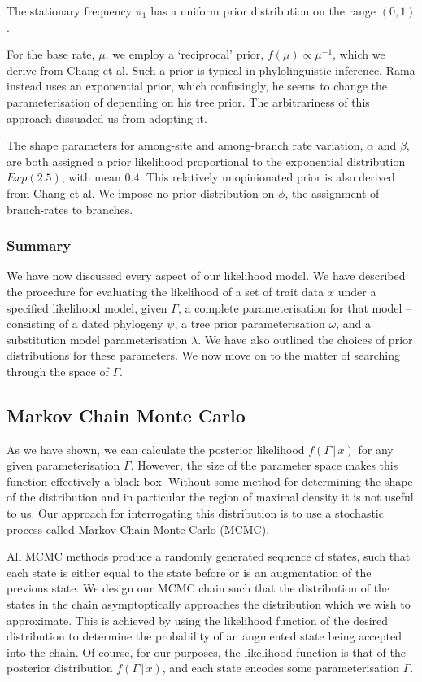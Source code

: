 \documentclass[10pt,journal,compsoc]{IEEEtran}
\begin{document}
The stationary frequency $\pi_1$ has a uniform prior distribution on the range $(0, 1)$.

For the base rate, $\mu$, we employ a `reciprocal' prior, $f(\mu) \propto \mu^{-1}$, which we derive from Chang et al. Such a prior is typical in phylolinguistic inference. Rama instead uses an exponential prior, which confusingly, he seems to change the parameterisation of depending on his tree prior. The arbitrariness of this approach dissuaded us from adopting it.

The shape parameters for among-site and among-branch rate variation, $\alpha$ and $\beta$, are both assigned a prior likelihood proportional to the exponential distribution $Exp(2.5)$, with mean $0.4$. This relatively unopinionated prior is also derived from Chang et al. We impose no prior distribution on $\phi$, the assignment of branch-rates to branches.

\subsubsection{Summary}

We have now discussed every aspect of our likelihood model. We have described the procedure for evaluating the likelihood of a set of trait data $x$ under a specified likelihood model, given $\Gamma$, a complete parameterisation for that model -- consisting of a dated phylogeny $\psi$, a tree prior parameterisation $\omega$, and a substitution model parameterisation $\lambda$. We have also outlined the choices of prior distributions for these parameters. We now move on to the matter of searching through the space of $\Gamma$.

\subsection{Markov Chain Monte Carlo}

As we have shown, we can calculate the posterior likelihood $f(\Gamma\,|\,x)$ for any given parameterisation $\Gamma$. However, the size of the parameter space makes this function effectively a black-box. Without some method for determining the shape of the distribution and in particular the region of maximal density it is not useful to us. Our approach for interrogating this distribution is to use a stochastic process called Markov Chain Monte Carlo (MCMC).

All MCMC methods produce a randomly generated sequence of states, such that each state is either equal to the state before or is an augmentation of the previous state. We design our MCMC chain such that the distribution of the states in the chain asymptoptically approaches the distribution which we wish to approximate. This is achieved by using the likelihood function of the desired distribution to determine the probability of an augmented state being accepted into the chain. Of course, for our purposes, the likelihood function is that of the posterior distribution $f(\Gamma\,|\,x)$, and each state encodes some parameterisation $\Gamma$.  
\end{document}
